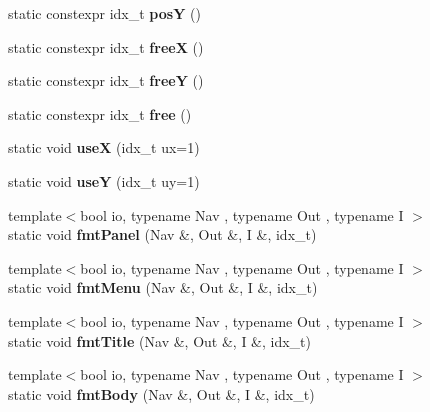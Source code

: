 \begin{DoxyCompactItemize}
static constexpr idx\+\_\+t {\bfseries posY} ()
\item 
\mbox{\label{structVoid_aeda7c506e42186ecbe531c55632dd7bd}} 
static constexpr idx\+\_\+t {\bfseries freeX} ()
\item 
\mbox{\label{structVoid_add816a78c9bd1d996dbd751020d79123}} 
static constexpr idx\+\_\+t {\bfseries freeY} ()
\item 
\mbox{\label{structVoid_aecac73cb414c2d04878c41e14805fae7}} 
static constexpr idx\+\_\+t {\bfseries free} ()
\item 
\mbox{\label{structVoid_a3742732d15bd1357f46ab2c0ce7b9c46}} 
static void {\bfseries useX} (idx\+\_\+t ux=1)
\item 
\mbox{\label{structVoid_ad01da3307c1145fe31c1bcfa902eb7b5}} 
static void {\bfseries useY} (idx\+\_\+t uy=1)
\item 
\mbox{\label{structVoid_a2ef12bd61c95a8d1079cc7363ba0494e}} 
{\footnotesize template$<$bool io, typename Nav , typename Out , typename I $>$ }\\static void {\bfseries fmt\+Panel} (Nav \&, Out \&, I \&, idx\+\_\+t)
\item 
\mbox{\label{structVoid_ae76982cd19123e6e4a6b89f4d49e7f4b}} 
{\footnotesize template$<$bool io, typename Nav , typename Out , typename I $>$ }\\static void {\bfseries fmt\+Menu} (Nav \&, Out \&, I \&, idx\+\_\+t)
\item 
\mbox{\label{structVoid_a54cd01b5883af35890d552d2db540bdf}} 
{\footnotesize template$<$bool io, typename Nav , typename Out , typename I $>$ }\\static void {\bfseries fmt\+Title} (Nav \&, Out \&, I \&, idx\+\_\+t)
\item 
\mbox{\label{structVoid_a14c74607d350e962c53097ad69fafbfa}} 
{\footnotesize template$<$bool io, typename Nav , typename Out , typename I $>$ }\\static void {\bfseries fmt\+Body} (Nav \&, Out \&, I \&, idx\+\_\+t)
\item 
\mbox{\label{structVoid_addf546a0bb5b67bcafd8a5350c6944c3}} 

\end{DoxyCompactItemize}
